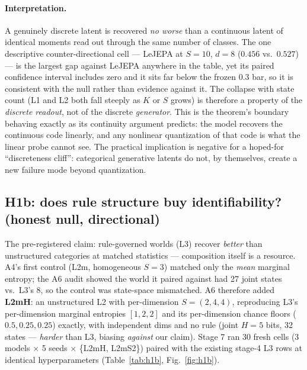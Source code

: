 \documentclass[10pt]{article}
\begin{document}
\paragraph{Interpretation.}
A genuinely discrete latent is recovered \emph{no worse} than a continuous
latent of identical moments read out through the same number of classes. The
one descriptive counter-directional cell --- LeJEPA at $S{=}10$, $d{=}8$
($0.456$ vs.\ $0.527$) --- is the largest gap against LeJEPA anywhere in the
table, yet its paired confidence interval includes zero and it sits far below
the frozen $0.3$ bar, so it is consistent with the null rather than evidence
against it. The
collapse with state count (L1 and L2 both fall steeply as $K$ or $S$ grows) is
therefore a property of the \emph{discrete readout}, not of the discrete
\emph{generator}. This is the theorem's boundary behaving exactly as its
continuity argument predicts: the model recovers the continuous code linearly,
and any nonlinear quantization of that code is what the linear probe cannot
see. The practical implication is negative for a hoped-for ``discreteness
cliff'': categorical generative latents do not, by themselves, create a new
failure mode beyond quantization.

\subsection{H1b: does rule structure buy identifiability? (honest null, directional)}
\label{sec:h1b}
The pre-registered claim: rule-governed worlds (L3) recover \emph{better} than
unstructured categories at matched statistics --- composition itself is a
resource. A4's first control (L2m, homogeneous $S{=}3$) matched only the
\emph{mean} marginal entropy; the A6 audit showed the world it paired against
had 27 joint states vs.\ L3's 8, so the control was state-space mismatched. A6
therefore added \textbf{L2mH}: an unstructured L2 with per-dimension
$S{=}(2,4,4)$, reproducing L3's per-dimension marginal entropies
$[1,2,2]$ and its per-dimension chance floors ($0.5,0.25,0.25$) exactly, with
independent dims and no rule (joint $H{=}5$ bits, 32 states --- \emph{harder}
than L3, biasing \emph{against} our claim). Stage 7 ran 30 fresh cells
(3 models $\times$ 5 seeds $\times$ \{L2mH, L2mS2\}) paired with the existing
stage-4 L3 rows at identical hyperparameters (Table~\ref{tab:h1b},
Fig.~\ref{fig:h1b}).
\end{document}
